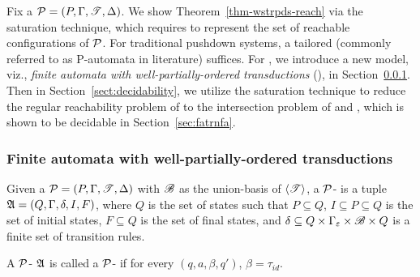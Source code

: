 Fix a  {\WOTrPDS} ${\mathcal{P} } = (P, \Gamma, {\mathscr{T} }, \Delta)$. %
We show Theorem~\ref{thm-wstrpds-reach} via the saturation technique, which %
requires to represent the set of reachable configurations of ${\mathcal{P} }$. For traditional pushdown systems, a tailored {\NFA} (commonly referred to as P-automata in literature) suffices. For {\WOTrPDS}, we %
introduce a new model, viz., \emph{finite automata with well-partially-ordered transductions} ({\WOTrNFA}), in Section~\ref{sec-wotrnfa}. 
Then in Section~\ref{sect:decidability}, we utilize the saturation technique to reduce the regular reachability problem of {\WOTrPDS} %
to the intersection problem of {\WOTrNFA} and {\NFA}, which is shown to be decidable in Section~\ref{sec:fatrnfa}.



\subsubsection{Finite automata with well-partially-ordered transductions}\label{sec-wotrnfa}
 
\begin{definition}[{\WOTrNFA}] %
	Given a {\WOTrPDS} ${\mathcal{P} }=(P, \Gamma, {\mathscr{T} }, \Delta)$ with ${\mathscr{B} }$ as the union-basis of $\langle {\mathscr{T} } \rangle$, a ${\mathcal{P} }$-{\WOTrNFA} is a tuple ${\mathfrak{A} } =(Q, \Gamma, \delta, I, F)$,
	where $Q$ is the set of states such that $P \subseteq Q$, $I\subseteq P\subseteq Q$ is the set of initial states, $F \subseteq Q$ is the set of final states,  
	and $\delta \subseteq Q \times \Gamma_\varepsilon \times {\mathscr{B} } \times Q$ is a finite set of transition rules.

    A ${\mathcal{P} }$-{\WOTrNFA} ${\mathfrak{A} }$ is called a {${\mathcal{P} }$-{\NFA}} if for every $(q, a, \beta, q')$, $\beta = \tau_{id}$. 
\end{definition}

